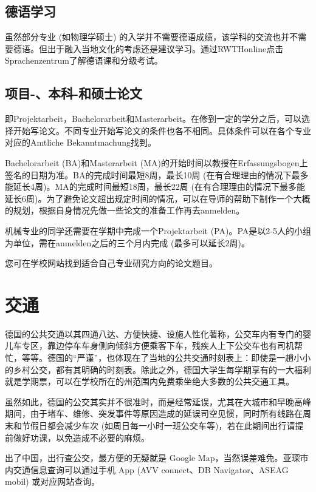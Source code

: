   \subsection{德语学习}

    虽然部分专业 (如物理学硕士) 的入学并不需要德语成绩，该学科的交流也并不需要德语。但出于融入当地文化的考虑还是建议学习。通过RWTHonline点击Sprachenzentrum了解德语课和分级考试。

  \subsection{项目-、本科-和硕士论文}

    即Projektarbeit，Bachelorarbeit和Masterarbeit。在修到一定的学分之后，可以选择开始写论文。不同专业开始写论文的条件也各不相同。具体条件可以在各个专业对应的Amtliche Bekanntmachung找到。

    Bachelorarbeit (BA)和Masterarbeit (MA)的开始时间以教授在Erfassungsbogen上签名的日期为准。BA的完成时间最短8周，最长10周 (在有合理理由的情况下最多能延长4周)。MA的完成时间最短18周，最长22周 (在有合理理由的情况下最多能延长6周)。为了避免论文超出规定时间的情况，可以在导师的帮助下制作一个大概的规划，根据自身情况先做一些论文的准备工作再去anmelden。

    机械专业的同学还需要在学期中完成一个Projektarbeit (PA)。PA是以2-5人的小组为单位，需在anmelden之后的三个月内完成 (最多可以延长2周)。

    您可在学校网站找到适合自己专业研究方向的论文题目。

\section{交通}

  德国的公共交通以其四通八达、方便快捷、设施人性化著称，公交车内有专门的婴儿车专区，靠边停车车身侧向倾斜方便乘客下车，残疾人上下公交车也有司机帮忙，等等。德国的``严谨''，也体现在了当地的公共交通时刻表上：即使是一趟小小的乡村公交，都有其明确的时刻表。除此之外，德国大学生每学期享有的一大福利就是学期票，可以在学校所在的州范围内免费乘坐绝大多数的公共交通工具。

  虽然如此，德国的公交其实并不很准时，而是经常延误，尤其在大城市和早晚高峰期间，由于堵车、维修、突发事件等原因造成的延误司空见惯，同时所有线路在周末和节假日都会减少车次 (如周日每一小时一班公交车等)，若在此期间出行请提前做好功课，以免造成不必要的麻烦。 

  出了中国，出行查公交，最方便的无疑就是 Google Map，当然误差难免。亚琛市内交通信息查询可以通过手机 App (AVV connect、DB Navigator、ASEAG mobil) 或对应网站查询。


